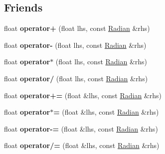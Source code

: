 \subsection*{Friends}
\begin{DoxyCompactItemize}
\item 
\hypertarget{classrcz_engine_1_1_radian_a7bf0a6791e8b2d7a9e3aeab320c88873}{}float {\bfseries operator+} (float lhs, const \hyperlink{classrcz_engine_1_1_radian}{Radian} \&rhs)\label{classrcz_engine_1_1_radian_a7bf0a6791e8b2d7a9e3aeab320c88873}

\item 
\hypertarget{classrcz_engine_1_1_radian_ade6e4783437ca171be3ad873962ca75f}{}float {\bfseries operator-\/} (float lhs, const \hyperlink{classrcz_engine_1_1_radian}{Radian} \&rhs)\label{classrcz_engine_1_1_radian_ade6e4783437ca171be3ad873962ca75f}

\item 
\hypertarget{classrcz_engine_1_1_radian_a9a35649ba91ca73fdc9464dc5e46d77e}{}float {\bfseries operator$\ast$} (float lhs, const \hyperlink{classrcz_engine_1_1_radian}{Radian} \&rhs)\label{classrcz_engine_1_1_radian_a9a35649ba91ca73fdc9464dc5e46d77e}

\item 
\hypertarget{classrcz_engine_1_1_radian_aa7c3da95a02074397d6500fb03e85862}{}float {\bfseries operator/} (float lhs, const \hyperlink{classrcz_engine_1_1_radian}{Radian} \&rhs)\label{classrcz_engine_1_1_radian_aa7c3da95a02074397d6500fb03e85862}

\item 
\hypertarget{classrcz_engine_1_1_radian_a0f124bf93c8b721e4d6cb63d186eb39b}{}float {\bfseries operator+=} (float \&lhs, const \hyperlink{classrcz_engine_1_1_radian}{Radian} \&rhs)\label{classrcz_engine_1_1_radian_a0f124bf93c8b721e4d6cb63d186eb39b}

\item 
\hypertarget{classrcz_engine_1_1_radian_a25d2199fe328c06570bd39feab8a1ba8}{}float {\bfseries operator$\ast$=} (float \&lhs, const \hyperlink{classrcz_engine_1_1_radian}{Radian} \&rhs)\label{classrcz_engine_1_1_radian_a25d2199fe328c06570bd39feab8a1ba8}

\item 
\hypertarget{classrcz_engine_1_1_radian_a62463164d82eeb2944c7af4f56ed437c}{}float {\bfseries operator-\/=} (float \&lhs, const \hyperlink{classrcz_engine_1_1_radian}{Radian} \&rhs)\label{classrcz_engine_1_1_radian_a62463164d82eeb2944c7af4f56ed437c}

\item 
\hypertarget{classrcz_engine_1_1_radian_af1ae396d15ef781790db3180e03d32cd}{}float {\bfseries operator/=} (float \&lhs, const \hyperlink{classrcz_engine_1_1_radian}{Radian} \&rhs)\label{classrcz_engine_1_1_radian_af1ae396d15ef781790db3180e03d32cd}


\end{DoxyCompactItemize}
